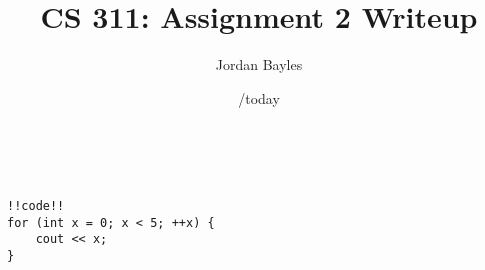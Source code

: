 \documentclass[12pt,letterpaper]{article}
\author{Jordan Bayles}
\title{CS 311: Assignment 2 Writeup}
\date{/today}
\makeatletter
\let\thetitle\@title
\let\theauthor\@author
\let\thedate\@date
\makeatother
\begin{document}
\begin{flushright}
\theauthor\\
\thedate
\end{flushright}
\begin{center}
\thetitle
\end{center}

\begin{lstlisting}
!!code!!
for (int x = 0; x < 5; ++x) {
	cout << x;
}
\end{lstlisting}

% 

%

\end{document}
